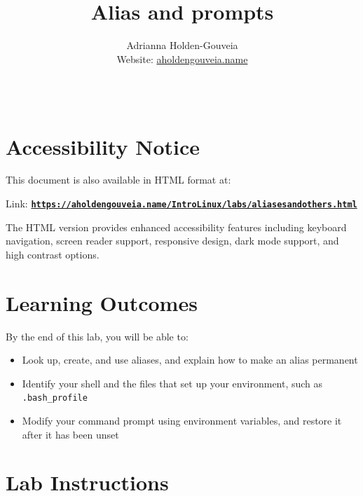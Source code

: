 \documentclass[12pt]{article}
\title{Alias and prompts}
\author{
        Adrianna Holden-Gouveia \\
        Website: \href{https://aholdengouveia.name}{aholdengouveia.name}\\ 
        \date{\vspace{-5ex}}
        \faGithub {: aholdengouveia} \\
        }
\begin{document}
    

\maketitle

\section*{Accessibility Notice}
This document is also available in HTML format at:

Link: \href{https://aholdengouveia.name/IntroLinux/labs/aliasesandothers.html}{\textbf{\nolinkurl{https://aholdengouveia.name/IntroLinux/labs/aliasesandothers.html}}}

The HTML version provides enhanced accessibility features including keyboard navigation, screen reader support, responsive design, dark mode support, and high contrast options.



\section*{Learning Outcomes}
By the end of this lab, you will be able to:
\begin{itemize}
    \item Look up, create, and use aliases, and explain how to make an alias permanent
    \item Identify your shell and the files that set up your environment, such as \nolinkurl{.bash_profile}
    \item Modify your command prompt using environment variables, and restore it after it has been unset
\end{itemize}
\section*{Lab Instructions}
\end{document}
